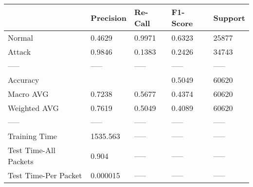 \begin{tabular}{lllll}
\toprule
{} & Precision & Re-Call & F1-Score & Support \\
\midrule
Normal                &    0.4629 &  0.9971 &   0.6323 &   25877 \\
Attack                &    0.9846 &  0.1383 &   0.2426 &   34743 \\
-----                 &     ----- &   ----- &    ----- &   ----- \\
Accuracy              &           &         &   0.5049 &   60620 \\
Macro AVG             &    0.7238 &  0.5677 &   0.4374 &   60620 \\
Weighted AVG          &    0.7619 &  0.5049 &   0.4089 &   60620 \\
-----                 &     ----- &   ----- &    ----- &   ----- \\
Training Time         &  1535.563 &   ----- &    ----- &   ----- \\
Test Time-All Packets &     0.904 &   ----- &    ----- &   ----- \\
Test Time-Per Packet  &  0.000015 &   ----- &    ----- &   ----- \\
\bottomrule
\end{tabular}
